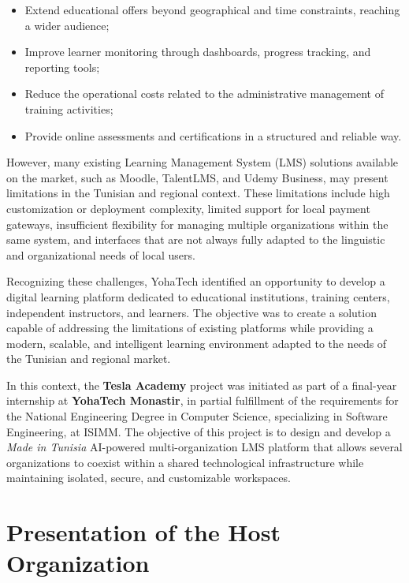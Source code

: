 \begin{itemize}
  \item Extend educational offers beyond geographical and time constraints, reaching a
        wider audience;
  \item Improve learner monitoring through dashboards, progress tracking, and reporting
        tools;
  \item Reduce the operational costs related to the administrative management of training
        activities;
  \item Provide online assessments and certifications in a structured and reliable way.
\end{itemize}
However, many existing Learning Management System (LMS) solutions available on the market,
such as Moodle, TalentLMS, and Udemy Business, may present limitations in the Tunisian and
regional context. These limitations include high customization or deployment complexity,
limited support for local payment gateways, insufficient flexibility for managing multiple
organizations within the same system, and interfaces that are not always fully adapted to
the linguistic and organizational needs of local users.

Recognizing these challenges, YohaTech identified an opportunity to develop a digital
learning platform dedicated to educational institutions, training centers, independent
instructors, and learners. The objective was to create a solution capable of addressing
the limitations of existing platforms while providing a modern, scalable, and intelligent
learning environment adapted to the needs of the Tunisian and regional market.

In this context, the \textbf{Tesla Academy} project was initiated as part of a final-year
internship at \textbf{YohaTech Monastir}, in partial fulfillment of the requirements for the
National Engineering Degree in Computer Science, specializing in Software Engineering, at
ISIMM. The objective of this project is to design and develop a \textit{Made in Tunisia}
AI-powered multi-organization LMS platform that allows several organizations to coexist
within a shared technological infrastructure while maintaining isolated, secure, and
customizable workspaces.

\section{Presentation of the Host Organization}

